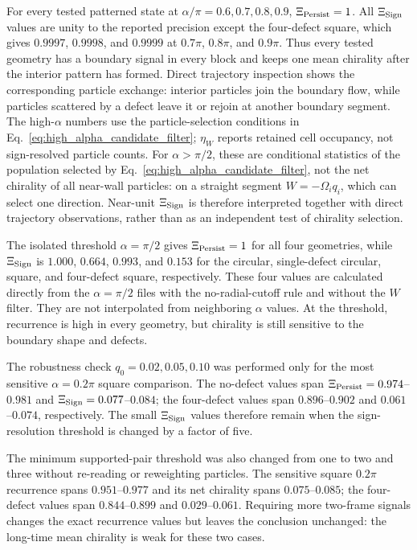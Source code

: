\documentclass[11pt]{article}
\numberwithin{equation}{section}
\begin{document}
For every tested patterned state at
$\alpha/\pi=0.6,0.7,0.8,0.9$, $\Xi_{\rm Persist}=1$.  All
$\Xi_{\rm Sign}$ values are unity to the reported precision except the four-defect square,
which gives $0.9997$, $0.9998$, and $0.9999$ at $0.7\pi$, $0.8\pi$, and
$0.9\pi$.  Thus every tested geometry has a boundary signal in every block and
keeps one mean chirality after the interior pattern has formed.  Direct
trajectory inspection shows the corresponding particle exchange: interior
particles join the boundary flow, while particles scattered by a defect leave
it or rejoin at another boundary segment.  The high-$\alpha$ numbers use the
particle-selection conditions in Eq.~\eqref{eq:high_alpha_candidate_filter};
$\eta_W$ reports retained cell occupancy, not sign-resolved particle counts.
For $\alpha>\pi/2$, these are conditional statistics of the population
selected by Eq.~\eqref{eq:high_alpha_candidate_filter}, not the net chirality
of all near-wall particles: on a straight segment $W=-\Omega_iq_i$, which
can select one direction. Near-unit $\Xi_{\rm Sign}$ is therefore interpreted
together with direct trajectory observations, rather than as an independent
test of chirality selection.

The isolated threshold $\alpha=\pi/2$ gives $\Xi_{\rm Persist}=1$ for all four
geometries, while $\Xi_{\rm Sign}$ is $1.000$, $0.664$, $0.993$, and $0.153$
for the circular, single-defect circular, square, and four-defect square,
respectively.  These four values are calculated directly from the
$\alpha=\pi/2$ files with the no-radial-cutoff rule and without the $W$ filter.
They are not interpolated from neighboring $\alpha$ values.  At the threshold,
recurrence is high in every geometry, but chirality is still sensitive to the
boundary shape and defects.

The robustness check $q_0=0.02,0.05,0.10$ was performed only for the most
sensitive $\alpha=0.2\pi$ square comparison.  The no-defect values span
$\Xi_{\rm Persist}=0.974$--$0.981$ and
$\Xi_{\rm Sign}=0.077$--$0.084$; the four-defect values span
$0.896$--$0.902$ and $0.061$--$0.074$, respectively.  The small
$\Xi_{\rm Sign}$ values therefore remain when the sign-resolution threshold is
changed by a factor of five.

The minimum supported-pair threshold was also changed from one to two and
three without re-reading or reweighting particles.  The sensitive square
$0.2\pi$ recurrence spans $0.951$--$0.977$ and its net chirality spans
$0.075$--$0.085$; the four-defect values span $0.844$--$0.899$ and
$0.029$--$0.061$.  Requiring more two-frame signals changes the exact
recurrence values but leaves the conclusion unchanged: the long-time mean
chirality is weak for these two cases.
\end{document}
